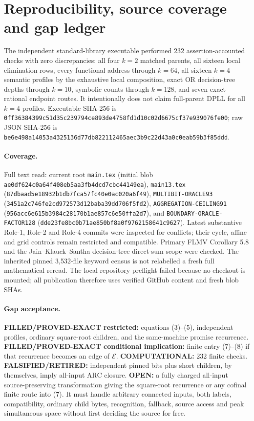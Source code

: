 \documentclass[11pt]{article}
\begin{document}
\section{Reproducibility, source coverage and gap ledger}
The independent standard-library executable performed 232
assertion-accounted checks with zero discrepancies: all four $k=2$ matched
parents, all sixteen local elimination rows, every functional address through
$k=64$, all sixteen $k=4$ semantic profiles by the exhaustive local
composition, exact OR decision-tree depths through $k=10$, symbolic counts
through $k=128$, and seven exact-rational endpoint routes.  It intentionally
does not claim full-parent DPLL for all $k=4$ profiles.  Executable SHA-256 is
\texttt{0ff36384399c51d35c239794ce893de4758fd1d10c02d6675cf37e939076fe00};
raw JSON SHA-256 is
\texttt{be6e498a14053a4325136d77db822112465aec3b9c22d43a0c0eab59b3f85ddd}.

\paragraph{Coverage.}
Full text read: current root \texttt{main.tex} (initial blob
\texttt{ae0df624c0a64f408eb5aa3fb4dcd7cbc44149ea}), \texttt{main13.tex}
(\texttt{87dbaad5e18932b1db7fca57fc40e0ac020a6f49}),
\texttt{MULTIBIT-ORACLE93} (\texttt{3451a2c746fe2cd972573d12baba39dd706f5fd2}),
\texttt{AGGREGATION-CEILING91} (\texttt{956acc6e615b3984c28170b1ae857c6e50ffa2d7}),
and \texttt{BOUNDARY-ORACLE-FACTOR128}
(\texttt{dde23fe8bc0b71ae850bf8a0f9762158641c9627}).  Latest substantive
Role-1, Role-2 and Role-4 commits were inspected for conflicts; their cycle,
affine and grid controls remain restricted and compatible.  Primary FLMV
Corollary 5.8 and the Jain--Klauck--Santha decision-tree direct-sum scope were
checked.  The inherited pinned 3,532-file keyword census is not relabelled a
fresh full mathematical reread.  The local repository preflight failed
because no checkout is mounted; all publication therefore uses verified
GitHub content and fresh blob SHAs.

\paragraph{Gap acceptance.}
\textbf{FILLED/PROVED-EXACT restricted:} equations (3)--(5), independent
profiles, ordinary square-root children, and the same-machine promise
recurrence.  \textbf{FILLED/PROVED-EXACT conditional implication:} finite
entry (7)--(8) if that recurrence becomes an edge of $\mathcal E$.
\textbf{COMPUTATIONAL:} 232 finite checks.
\textbf{FALSIFIED/RETIRED:} independent pinned bits plus short children, by
themselves, imply all-input ARC closure.  \textbf{OPEN:} a fully charged
all-input source-preserving transformation giving the square-root recurrence
or any cofinal finite route into (7).  It must handle arbitrary connected
inputs, both labels, compatibility, ordinary child bytes, recognition,
fallback, source access and peak simultaneous space without first deciding
the source for free.
\end{document}
